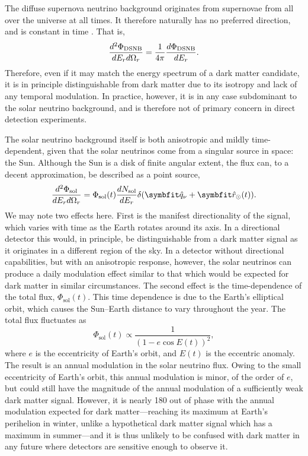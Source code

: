 The diffuse supernova neutrino background originates from supernovae from all over the universe at all times. It therefore naturally has no preferred direction, and is constant in time \parencite{Beacom2010}. That is,
\begin{equation}
    \frac{d^2\Phi_\text{DSNB}}{dE_rd\Omega_r}=\frac{1}{4\pi}\frac{d\Phi_\text{DSNB}}{dE_r}.
\end{equation}
Therefore, even if it may match the energy spectrum of a dark matter candidate, it is in principle distinguishable from dark matter due to its isotropy and lack of any temporal modulation. In practice, however, it is in any case subdominant to the solar neutrino background, and is therefore not of primary concern in direct detection experiments.

The solar neutrino background itself is both anisotropic and mildly time-dependent, given that the solar neutrinos come from a singular source in space: the Sun. Although the Sun is a disk of finite angular extent, the flux can, to a decent approximation, be described as a point source,
\begin{equation}
    \ddder{\Phi_\text{sol}}{E_r}{\Omega_r}=\Phi_\text{sol}(t)\der{N_\text{sol}}{E_r}\delta(\unitv{q}_\nu+\unitv{r}_\odot(t)).
\end{equation}
We may note two effects here. First is the manifest directionality of the signal, which varies with time as the Earth rotates around its axis. In a directional detector this would, in principle, be distinguishable from a dark matter signal as it originates in a different region of the sky. In a detector without directional capabilities, but with an anisotropic response, however, the solar neutrinos can produce a daily modulation effect similar to that which would be expected for dark matter in similar circumstances. The second effect is the time-dependence of the total flux, $\Phi_\text{sol}(t)$. This time dependence is due to the Earth's elliptical orbit, which causes the Sun--Earth distance to vary throughout the year. The total flux fluctuates as
\begin{equation}
    \Phi_\text{sol}(t)\propto\frac{1}{(1-e\cos E(t))^2},
\end{equation}
where $e$ is the eccentricity of Earth's orbit, and $E(t)$ is the eccentric anomaly. The result is an annual modulation in the solar neutrino flux. Owing to the small eccentricity of Earth's orbit, this annual modulation is minor, of the order of $e$, but could still have the magnitude of the annual modulation of a sufficiently weak dark matter signal. However, it is nearly 180\degree{} out of phase with the annual modulation expected for dark matter---reaching its maximum at Earth's perihelion in winter, unlike a hypothetical dark matter signal which has a maximum in summer---and it is thus unlikely to be confused with dark matter in any future where detectors are sensitive enough to observe it. 

